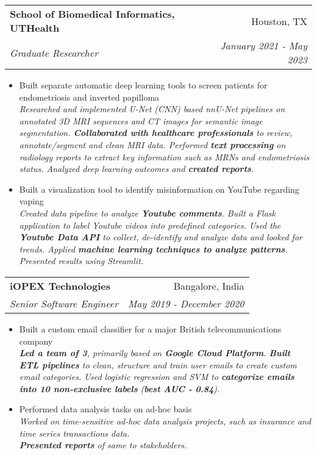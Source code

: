 \documentclass[a4paper,10.8pt]{article}
\makeatletter
\newcommand{\resumeSubheading}[4]{
  \vspace{-1pt}\item
    \begin{tabular*}{0.97\textwidth}{l@{\extracolsep{\fill}}r}
      \textbf{#1} & #2 \\
      \textit{\small#3} & \textit{\small #4} \\
    \end{tabular*}\vspace{-5pt}
}
\makeatother
\begin{document}
    \resumeSubheading
    {School of Biomedical Informatics, UTHealth}{Houston, TX}
    {Graduate Researcher}{January 2021 - May 2023}
    \begin{itemize}
        \item Built separate automatic deep learning tools to screen patients for endometriosis and inverted papilloma\\
            \textit{
            Researched and implemented U-Net (CNN) based nnU-Net pipelines on annotated 3D MRI sequences and CT images for semantic image segmentation.
            \textbf{Collaborated with healthcare professionals} to review, annotate/segment and clean MRI data. 
            Performed \textbf{text processing} on radiology reports to extract key information such as MRNs and endometriosis status.
            Analyzed deep learning outcomes and \textbf{created reports}.
            }
        \item Built a visualization tool to identify misinformation on YouTube regarding vaping\\
            \textit{
            Created data pipeline to analyze \textbf{Youtube comments}.
            Built a Flask application to label Youtube videos into predefined categories.
            Used the \textbf{Youtube Data API} to collect, de-identify and analyze data and looked for trends.
            Applied \textbf{machine learning techniques to analyze patterns}. Presented results using Streamlit. 
            }
      \end{itemize}

    \resumeSubheading
    {iOPEX Technologies}{Bangalore, India}
    {Senior Software Engineer}{May 2019 - December 2020}
    \begin{itemize}
      \item Built a custom email classifier for a major British telecommunications company\\
      \textit{\textbf{Led a team of 3}, primarily based on \textbf{Google Cloud Platform}.
      \textbf{Built ETL pipelines} to clean, structure and train user emails to create custom email categories.
      Used logistic regression and SVM to \textbf{categorize emails into 10 non-exclusive labels} (\textbf{best AUC - 0.84}).
      }
      \item Performed data analysis tasks on ad-hoc basis\\
      \textit{Worked on time-sensitive ad-hoc data analysis projects, such as insurance and time series transactions data.\\
        \textbf{Presented reports} of same to stakeholders.
      }
      
    \end{itemize}
      
\end{document}
